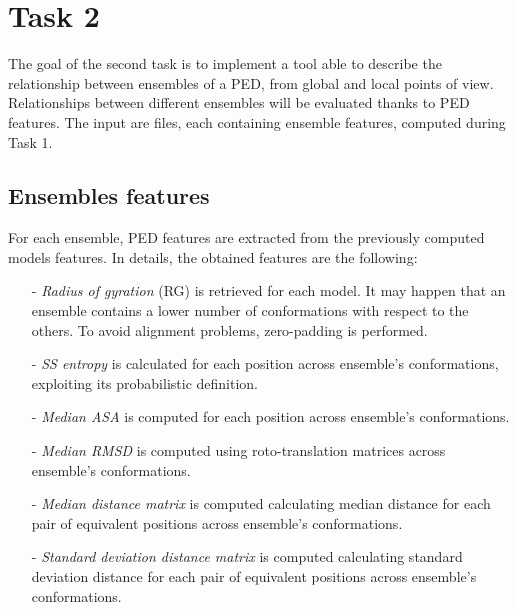 \section{Task 2}\label{sec:task2}

The goal of the second task is to implement a tool able to describe the relationship between ensembles of a PED, from global and local points of view. Relationships between different ensembles will be evaluated thanks to PED features. The input are files, each containing ensemble features, computed during Task 1.

\subsection{Ensembles features}
For each ensemble, PED features are extracted from the previously computed models features. In details, the obtained features are the following:

\begin{itemize}
\item[-] \emph{Radius of gyration} (RG) is retrieved for each model. It may happen that an ensemble contains a lower number of conformations with respect to the others. To avoid alignment problems, zero-padding is performed.
\item[-] \emph{SS entropy} is calculated for each position across ensemble's conformations, exploiting its probabilistic definition.
\item[-] \emph{Median ASA} is computed for each position across ensemble's conformations.
\item[-] \emph{Median RMSD} is computed using roto-translation matrices across ensemble's conformations.
\item[-] \emph{Median distance matrix} is computed calculating median distance for each pair of equivalent positions across ensemble's conformations.
\item[-] \emph{Standard deviation distance matrix} is computed calculating standard deviation distance for each pair of equivalent positions across ensemble's conformations.
\end{itemize}

